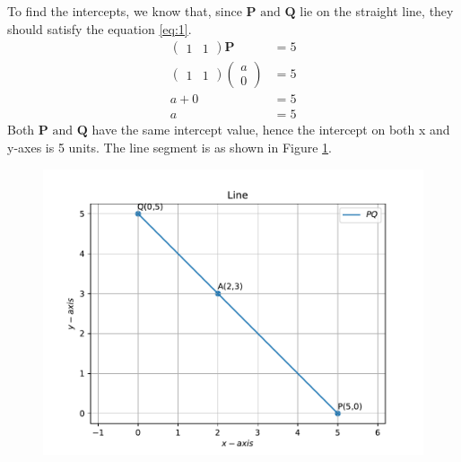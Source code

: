 \documentclass[12pt]{article}
\newcommand{\myvec}[1]{\ensuremath{\begin{pmatrix}#1\end{pmatrix}}}
\let\vec\mathbf
\begin{document}
\begin{enumerate}
To find the intercepts, we know that, since $\vec{P} \text{ and } \vec{Q}$ lie on the straight line, they should satisfy the equation \ref{eq:1}.
\begin{align}
	\myvec{ 1 & 1} \vec{P}  &= 5 \\
	\myvec{ 1 & 1} \myvec{a \\
	                      0 }  &= 5 \\ 
	a + 0 &= 5 \\
	a &= 5 
\end{align}
Both $\vec{P} \text{ and } \vec{Q}$ have the same intercept value, hence the intercept on both x and y-axes is 5 units. The line segment is as shown in Figure \ref{fig:Fig1}.
\begin{figure}[!h]
	\begin{center}
		\includegraphics[width=\columnwidth]{./figs/problem12.pdf}
	\end{center}
\caption{}
\label{fig:Fig1}
\end{figure}

\end{enumerate}
\end{document}
